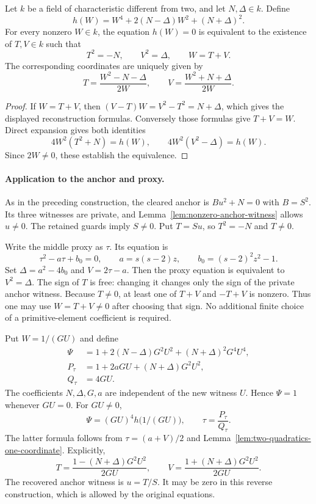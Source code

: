 \begin{lemma}\label{lem:two-quadratics-one-coordinate}
Let $k$ be a field of characteristic different from two, and let
$N,\Delta\in k$. Define
\[
 h(W)=W^4+2(N-\Delta)W^2+(N+\Delta)^2.
\]
For every nonzero $W\in k$, the equation $h(W)=0$ is equivalent to
the existence of $T,V\in k$ such that
\[
 T^2=-N,\qquad V^2=\Delta,\qquad W=T+V.
\]
The corresponding coordinates are uniquely given by
\[
 T=\frac{W^2-N-\Delta}{2W},\qquad
 V=\frac{W^2+N+\Delta}{2W}.
\]
\end{lemma}
\begin{proof}
If $W=T+V$, then $(V-T)W=V^2-T^2=N+\Delta$, which gives the
displayed reconstruction formulas. Conversely those formulas give
$T+V=W$. Direct expansion gives both identities
\[
 4W^2(T^2+N)=h(W),\qquad
 4W^2(V^2-\Delta)=h(W).
\]
Since $2W\ne0$, these establish the equivalence.
\end{proof}

\paragraph{Application to the anchor and proxy.}
As in the preceding construction, the cleared anchor is $Bu^2+N=0$
with $B=S^2$. Its three witnesses are private, and
Lemma~\ref{lem:nonzero-anchor-witness} allows $u\ne0$. The retained
guards imply $S\ne0$. Put $T=Su$, so $T^2=-N$ and $T\ne0$.

Write the middle proxy as $\tau$. Its equation is
\[
 \tau^2-a\tau+b_0=0,
 \qquad a=s(s-2)z,
 \qquad b_0=(s-2)^2z^2-1.
\]
Set $\Delta=a^2-4b_0$ and $V=2\tau-a$. Then the proxy equation is
equivalent to $V^2=\Delta$. The sign of $T$ is free: changing it
changes only the sign of the private anchor witness. Because $T\ne0$,
at least one of $T+V$ and $-T+V$ is nonzero. Thus one may use
$W=T+V\ne0$ after choosing that sign. No additional finite choice
of a primitive-element coefficient is required.

Put $W=1/(GU)$ and define
\begin{align*}
 \Psi&=1+2(N-\Delta)G^2U^2+(N+\Delta)^2G^4U^4,\\
 P_\tau&=1+2aGU+(N+\Delta)G^2U^2,\\
 Q_\tau&=4GU.
\end{align*}
The coefficients $N,\Delta,G,a$ are independent of the new witness
$U$. Hence $\Psi=1$ whenever $GU=0$. For $GU\ne0$,
\[
 \Psi=(GU)^4 h\bigl(1/(GU)\bigr),\qquad
 \tau=\frac{P_\tau}{Q_\tau}.
\]
The latter formula follows from $\tau=(a+V)/2$ and
Lemma~\ref{lem:two-quadratics-one-coordinate}. Explicitly,
\[
 T=\frac{1-(N+\Delta)G^2U^2}{2GU},\qquad
 V=\frac{1+(N+\Delta)G^2U^2}{2GU}.
\]
The recovered anchor witness is $u=T/S$. It may be zero in this
reverse construction, which is allowed by the original equations.

